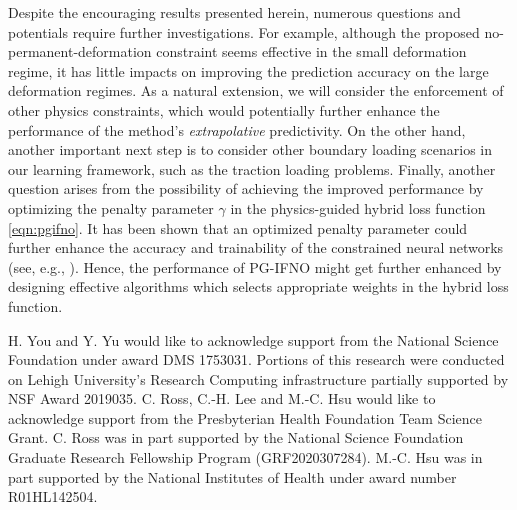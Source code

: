 \documentclass[twocolumn,10pt]{asme2ej}
\renewcommand{\~}{\tilde}
\renewcommand{\-}{\bar}
\newcommand{\8}{\infty}
\numberwithin{equation}{section}
\begin{document}
Despite the encouraging results presented herein, numerous questions and potentials require further investigations. For example, although the proposed no-permanent-deformation constraint seems effective in the small deformation regime, it has little impacts on improving the prediction accuracy on the large deformation regimes. As a natural extension, we will consider the enforcement of other physics constraints, which would potentially further enhance the performance of the method's {\it extrapolative} predictivity. On the other hand, another important next step is to consider other boundary loading scenarios in our learning framework, such as the traction loading problems. Finally, another question arises from the possibility of achieving the improved performance by optimizing the penalty parameter $\gamma$ in the physics-guided hybrid loss function \eqref{eqn:pgifno}. It has been shown that an optimized penalty parameter could further enhance the accuracy and trainability of the constrained neural networks (see, e.g., \cite{wang2021learning,wang2022and,mcclenny2020self}). Hence, the performance of PG-IFNO might get further enhanced by designing effective algorithms which selects appropriate weights in the hybrid loss function.



\begin{acknowledgment}
H. You and Y. Yu would like to acknowledge support from the National Science Foundation under award DMS 1753031. Portions of this research were conducted on Lehigh University's Research Computing infrastructure partially supported by NSF Award 2019035. C. Ross, C.-H. Lee and M.-C. Hsu would like to acknowledge support from the Presbyterian Health Foundation Team Science Grant. C. Ross was in part supported by the National Science Foundation Graduate Research Fellowship Program (GRF2020307284). M.-C. Hsu was in part supported by the National Institutes of Health under award number R01HL142504.
\end{acknowledgment}



\end{document}
